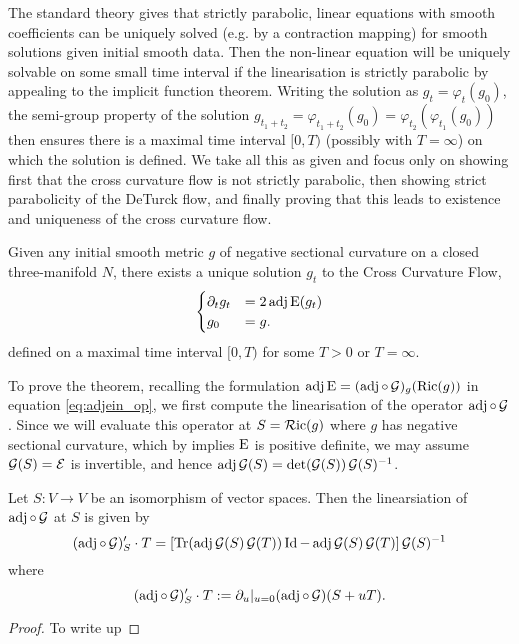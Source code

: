 \documentclass[a4paper, 12pt]{amsart}
\begin{document}
The standard theory gives that strictly parabolic, linear equations with smooth coefficients can be uniquely solved (e.g. by a contraction mapping) for smooth solutions given initial smooth data. Then the non-linear equation will be uniquely solvable on some small time interval if the linearisation is strictly parabolic by appealing to the implicit function theorem. Writing the solution as \(g_t = \varphi_t(g_0)\), the semi-group property of the solution \(g_{t_1 + t_2} = \varphi_{t_1 + t_2} (g_0) = \varphi_{t_2} (\varphi_{t_1} (g_0))\) then ensures there is a maximal time interval \([0, T)\) (possibly with \(T = \infty\)) on which the solution is defined. We take all this as given and focus only on showing first that the cross curvature flow is not strictly parabolic, then showing strict parabolicity of the DeTurck flow, and finally proving that this leads to existence and uniqueness of the cross curvature flow.
\begin{thm}
\label{thm:xcf_existence_uniqueness}
Given any initial smooth metric \(g\) of negative sectional curvature on a closed three-manifold \(N\), there exists a unique solution \(g_t\) to the Cross Curvature Flow,
\[
\begin{cases}
\partial_t g_t &= 2\operatorname{adj}\operatorname{E}(g_t) \\
g_0 &= g.
\end{cases}
\]
defined on a maximal time interval \([0, T)\) for some \(T > 0\) or \(T = \infty\).
\end{thm}
To prove the theorem, recalling the formulation \(\operatorname{adj}\operatorname{E} = (\operatorname{adj}\circ\operatorname{\mathcal{G}})_g (\operatorname{Ric}(g))\) in equation \eqref{eq:adjein_op}, we first compute the linearisation of the operator \(\operatorname{adj} \circ \operatorname{\mathcal{G}}\). Since we will evaluate this operator at \(S = \operatorname{\mathcal{R}ic}(g)\) where \(g\) has negative sectional curvature, which by  implies \(\operatorname{E}\) is positive definite, we may assume \(\operatorname{\mathcal{G}}(S) = \operatorname{\mathcal{E}}\) is invertible, and hence \(\operatorname{adj} \operatorname{\mathcal{G}}(S) = \det(\operatorname{\mathcal{G}}(S)) \operatorname{\mathcal{G}}(S)^{-1}\).
\begin{lemma}
\label{lem:dadjG}
Let \(S : V \to V\) be an isomorphism of vector spaces. Then the linearsiation of \(\operatorname{adj} \circ \operatorname{\mathcal{G}}\) at \(S\) is given by
\[
(\operatorname{adj} \circ \operatorname{\mathcal{G}})'_S \cdot T  = \left[\operatorname{Tr}(\operatorname{adj}\operatorname{\mathcal{G}}(S) \operatorname{\mathcal{G}}(T))\operatorname{Id} - \operatorname{adj}\operatorname{\mathcal{G}}(S) \operatorname{\mathcal{G}}(T)\right] \operatorname{\mathcal{G}}(S)^{-1}
\]
where
\[
(\operatorname{adj} \circ \operatorname{\mathcal{G}})'_S \cdot T := \partial_u|_{u=0} (\operatorname{adj} \circ \operatorname{\mathcal{G}}) (S + uT).
\]
\end{lemma}
\begin{proof}
{\color{red} To write up}
\end{proof}
\end{document}
